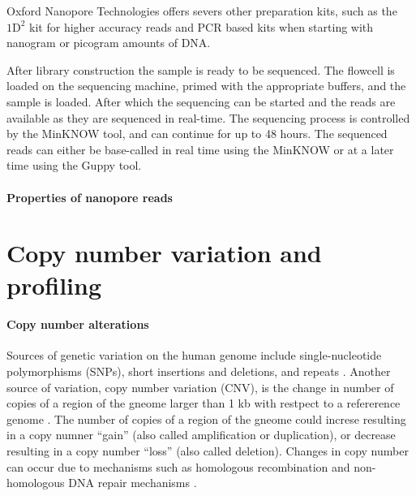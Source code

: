 Oxford Nanopore Technologies offers severs other preparation kits, such
as the $\text{1D}^2$ kit for higher accuracy reads and PCR based kits when
starting with nanogram or picogram amounts of DNA.

After library construction the sample is ready to be sequenced. The
flowcell is loaded on the sequencing machine, primed with the appropriate
buffers, and the sample is loaded. After which the sequencing can be
started and the reads are available as they are sequenced in real-time.
%
The sequencing process is controlled by the MinKNOW tool, and can
continue for up to 48 hours.
The sequenced reads can either be base-called in real time using the
MinKNOW or at a later time using the Guppy tool.

\paragraph{Properties of nanopore reads}



\section{Copy number variation and profiling}
\paragraph{Copy number alterations}
Sources of genetic variation on the human genome include
single-nucleotide polymorphisms (SNPs), short insertions and deletions, and
repeats \citep{}. 
Another source of variation, copy number variation (CNV), is the change in
number of copies of a region of the gneome larger than 1 kb with
restpect to a refererence genome
\citep{redon2006global,feuk2006structural}.  The number of copies of a
region of the gneome could increse resulting in a copy numner ``gain''
(also called amplification or duplication), or decrease resulting in a
copy number ``loss'' (also called deletion). 
Changes in copy number can occur due to mechanisms such as homologous
recombination and non-homologous DNA repair mechanisms
\citep{hastings2009mechanisms,van2011origins}.

